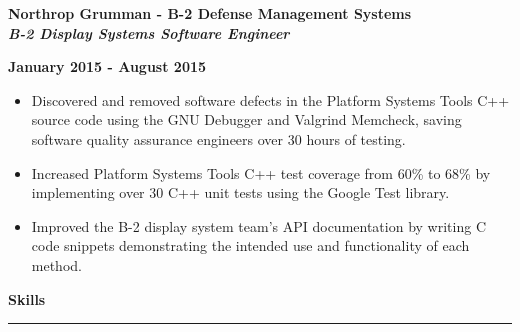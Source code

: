 \documentclass[10pt,letterpaper]{article}
\begin{document}
\begin{minipage}[t]{0.53\textwidth}
        \begin{flushleft}
                \textbf{Northrop Grumman - B-2 Defense Management Systems}\\
                \textbf{\textit{B-2 Display Systems Software Engineer}}\\
        \end{flushleft}
\end{minipage}
\begin{minipage}[t]{0.44\textwidth}
        \begin{flushright}
                \textbf{January 2015 - August 2015}
        \end{flushright}
\end{minipage}

\begin{itemize}[noitemsep,topsep=0pt]
        \setlength\itemsep{-0.10em}
        \item Discovered and removed software defects in the
              Platform Systems Tools C++ source code using the GNU Debugger and Valgrind
              Memcheck, saving software quality assurance engineers over 30 hours of
              testing.
        \item Increased Platform Systems Tools C++ test coverage from 60\% to 68\% by
              implementing over 30 C++ unit tests using the Google Test library.
        \item Improved the B-2 display system team's API documentation by writing C code
              snippets demonstrating the intended use and functionality of each method.
\end{itemize}

\medskip

\begin{large}
        \textbf{Skills}
\end{large}

\smallskip \hrule \smallskip
\end{document}
